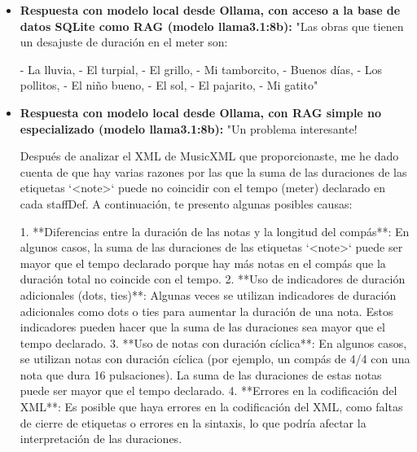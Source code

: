 \begin{itemize}
    Sumando las duraciones en ppq de estas notas: `2 + 1 + 1 + 1 + 1 + 2 + 1 = 9 ppq`.

*   **Comparación:**
    La suma calculada de las duraciones es `9 ppq`.
    La duración esperada según la signatura de compás es `18 ppq`.

Dado que `9 ppq` no coincide con `18 ppq`, el compás `m27vk` (número 10) del archivo `MX-1964-00-VM-02065\_updated.mei` sería un compás donde la suma de las duraciones de las notas no coincide con el `meterSig` declarado.

Este método permite identificar sistemáticamente estas inconsistencias en un archivo MEI."
    \item \textbf{Respuesta con modelo local desde Ollama, con acceso a la base de datos SQLite como RAG (modelo llama3.1:8b):} "Las obras que tienen un desajuste de duración en el meter son:

- La lluvia,
- El turpial,
- El grillo,
- Mi tamborcito,
- Buenos días,
- Los pollitos,
- El niño bueno,
- El sol,
- El pajarito,
- Mi gatito"
\item \textbf{Respuesta con modelo local desde Ollama, con RAG simple no especializado (modelo llama3.1:8b):} "Un problema interesante!

Después de analizar el XML de MusicXML que proporcionaste, me he dado cuenta de que hay varias razones por las que la suma de las duraciones de las etiquetas `<note>` puede no coincidir con el tempo (meter) declarado en cada staffDef. A continuación, te presento algunas posibles causas:

1. **Diferencias entre la duración de las notas y la longitud del compás**: En algunos casos, la suma de las duraciones de las etiquetas `<note>` puede ser mayor que el tempo declarado porque hay más notas en el compás que la duración total no coincide con el tempo.
2. **Uso de indicadores de duración adicionales (dots, ties)**: Algunas veces se utilizan indicadores de duración adicionales como dots o ties para aumentar la duración de una nota. Estos indicadores pueden hacer que la suma de las duraciones sea mayor que el tempo declarado.
3. **Uso de notas con duración cíclica**: En algunos casos, se utilizan notas con duración cíclica (por ejemplo, un compás de 4/4 con una nota que dura 16 pulsaciones). La suma de las duraciones de estas notas puede ser mayor que el tempo declarado.
4. **Errores en la codificación del XML**: Es posible que haya errores en la codificación del XML, como faltas de cierre de etiquetas o errores en la sintaxis, lo que podría afectar la interpretación de las duraciones.


\end{itemize}
